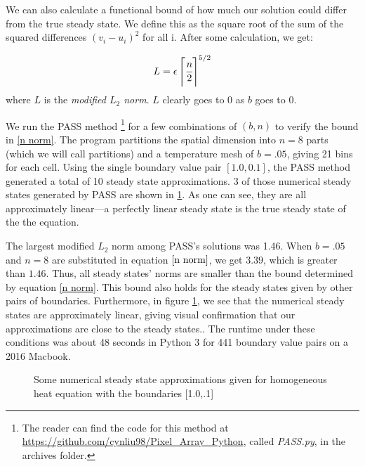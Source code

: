 \documentclass[11pt]{article}
\begin{document}
We can also calculate a functional bound of how much our solution could differ from the true steady state. We define this as the square root of the sum of the squared differences $(v_i-u_i)^2$ for all i. After some calculation, we get:

\begin{equation}
\label{n norm}
L = \epsilon \left \lceil \cfrac{n}{2} \right \rceil^{5/2}
\end{equation}
where $L$ is the \emph{modified $L_2$ norm}. $L$ clearly goes to 0 as $b$ goes to 0. 

We run the PASS method%
\footnote{The reader can find the code for this method at \url{https://github.com/cynliu98/Pixel\_Array\_Python}, called \textit{PASS.py}, in the archives folder.}
for a few combinations of $(b,n)$ to verify the bound in \eqref{n norm}. The program partitions the spatial dimension into $n=8$ parts (which we will call partitions) and a temperature mesh of $b = .05$, giving 21 bins for each cell. Using the single boundary value pair $[1.0,0.1]$, the PASS method generated a total of 10 steady state approximations. 3 of those numerical steady states generated by PASS are shown in \cref{heats}. As one can see, they are all approximately linear---a perfectly linear steady state is the true steady state of the the equation.

The largest modified $L_2$ norm among PASS's solutions was 1.46. When $b = .05$ and $n = 8$ are substituted in equation $\cref{n norm}$, we get $3.39$, which is greater than $1.46$. Thus, all steady states' norms are smaller than the bound determined by equation \cref{n norm}. This bound also holds for the steady states given by other pairs of boundaries. Furthermore, in figure \cref{heats}, we see that the numerical steady states are approximately linear, giving visual confirmation that our approximations are close to the steady states.. The runtime under these conditions was about 48 seconds in Python 3 for 441 boundary value pairs on a 2016 Macbook. 

\begin{figure}
\begin{center}
\caption{Some numerical steady state approximations given for homogeneous heat equation with the boundaries [1.0,.1]}
\label{heats}
\end{center}
\end{figure}
\end{document}

